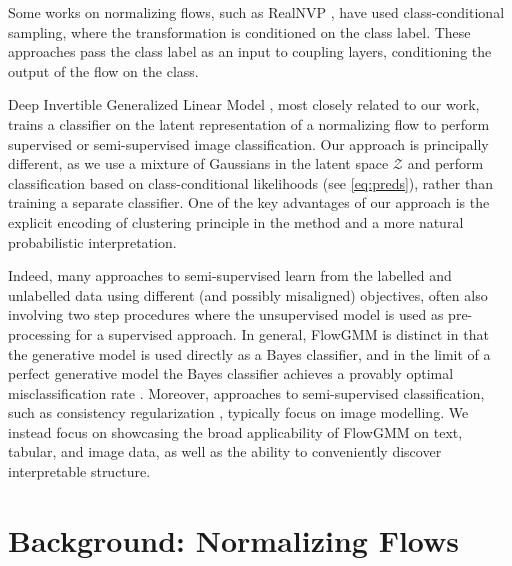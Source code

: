 \documentclass{article}
\newcommand{\method}{FlowGMM\xspace}
\newcommand{\mZ}{\mathcal{Z}}
\begin{document}
Some works on normalizing flows, such as RealNVP \citep{dinh2016density},
have used class-conditional sampling, where the transformation is conditioned on the class label. These approaches pass the class label as an input to coupling layers, conditioning the output of the flow on the class.

Deep Invertible Generalized Linear Model \citep[DIGLM, ][]{nalisnick2019hybrid}, most closely related to our work, trains a classifier on the latent representation of a normalizing flow
to perform supervised or semi-supervised image 
classification. 
Our approach is principally different, as we
use a mixture of Gaussians in the latent space $\mZ$
and perform classification based on class-conditional
likelihoods (see \eqref{eq:preds}), rather than training a
separate classifier. 
One of the key advantages of our
approach is the explicit encoding of clustering principle in the method and a more natural probabilistic interpretation.

Indeed, many approaches to semi-supervised learn from the labelled and unlabelled data using different (and possibly misaligned) objectives, often also involving two step procedures where the unsupervised model is used as pre-processing for a supervised approach.
In general, \method is distinct in that the generative model is used directly as a Bayes classifier, and in the limit of a perfect generative model the Bayes classifier achieves a provably optimal misclassification rate \citep[see e.g.][]{mohri2018foundations}. Moreover, approaches to semi-supervised classification, such as consistency regularization \citep{laine2016temporal, miyato2018virtual,tarvainen2017mean, athiwaratkun2018there, verma2019interpolation, berthelot2019mixmatch}, typically focus on image modelling. We instead focus on showcasing the broad applicability of \method on text, tabular, and image data, as well as the ability to conveniently discover interpretable structure.


\section{Background: Normalizing Flows}
\label{sec:background}
\end{document}
